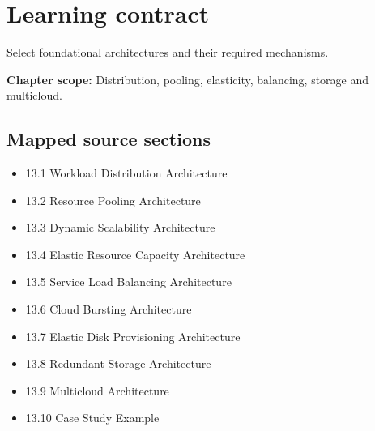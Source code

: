 \documentclass[10pt,letterpaper]{article}
\begin{document}
\sourceStatement
\tableofcontents
\newpage
\section{Learning contract}
\begin{takeaway}
Select foundational architectures and their required mechanisms.
\end{takeaway}
\textbf{Chapter scope:} Distribution, pooling, elasticity, balancing, storage and multicloud.\\
\subsection{Mapped source sections}
\begin{itemize}
\item 13.1 Workload Distribution Architecture
\item 13.2 Resource Pooling Architecture
\item 13.3 Dynamic Scalability Architecture
\item 13.4 Elastic Resource Capacity Architecture
\item 13.5 Service Load Balancing Architecture
\item 13.6 Cloud Bursting Architecture
\item 13.7 Elastic Disk Provisioning Architecture
\item 13.8 Redundant Storage Architecture
\item 13.9 Multicloud Architecture
\item 13.10 Case Study Example
\end{itemize}
\end{document}
